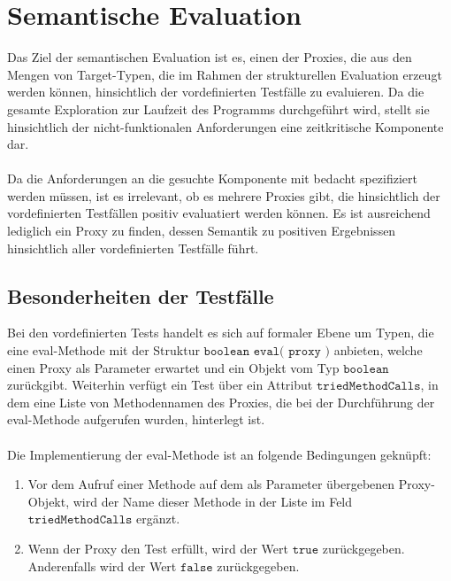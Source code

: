 \section{Semantische Evaluation}\label{sec_semEval}
Das Ziel der semantischen Evaluation ist es, einen der Proxies, die aus den Mengen von Target-Typen, die im Rahmen der strukturellen Evaluation erzeugt werden können, hinsichtlich der vordefinierten Testfälle zu evaluieren. Da die gesamte Exploration zur Laufzeit des Programms durchgeführt wird, stellt sie hinsichtlich der nicht-funktionalen Anforderungen eine zeitkritische Komponente dar.
\\\\
Da die Anforderungen an die gesuchte Komponente mit bedacht spezifiziert werden müssen, ist es irrelevant, ob es mehrere Proxies gibt, die hinsichtlich der vordefinierten Testfällen positiv evaluatiert werden können. Es ist ausreichend lediglich ein Proxy zu finden, dessen Semantik zu positiven Ergebnissen hinsichtlich aller vordefinierten Testfälle führt.
\subsection{Besonderheiten der Testfälle}\label{sec_testanforderungen}
Bei den vordefinierten Tests handelt es sich auf formaler Ebene um Typen, die eine eval-Methode mit der Struktur $\texttt{boolean eval( proxy )}$ anbieten, welche einen Proxy als Parameter erwartet und ein Objekt vom Typ $\texttt{boolean}$ zurückgibt. Weiterhin verfügt ein Test über ein Attribut $\texttt{triedMethodCalls}$, in dem eine Liste von Methodennamen des Proxies, die bei der Durchführung der eval-Methode aufgerufen wurden, hinterlegt ist.
\\\\
Die Implementierung der eval-Methode ist an folgende Bedingungen geknüpft:
\begin{enumerate}
\item Vor dem Aufruf einer Methode auf dem als Parameter übergebenen Proxy-Objekt, wird der Name dieser Methode in der Liste im Feld $\texttt{triedMethodCalls}$ ergänzt.
\item Wenn der Proxy den Test erfüllt, wird der Wert $\texttt{true}$ zurückgegeben. Anderenfalls wird der Wert $\texttt{false}$ zurückgegeben.
\end{enumerate}


